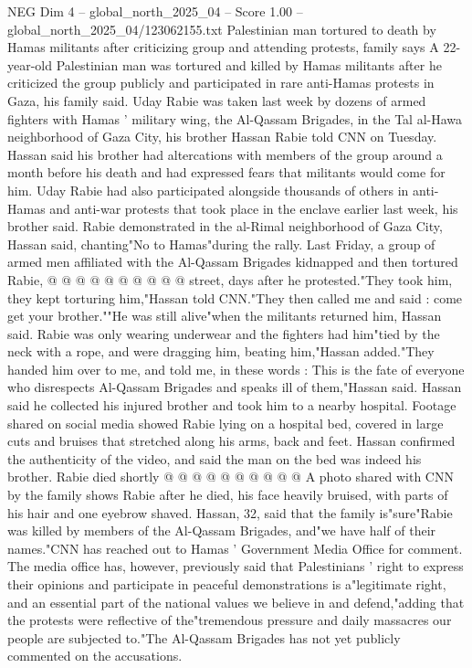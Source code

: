 \begin{textsample}{NEG Dim 4 – global\_north\_2025\_04 – Score 1.00 – global\_north\_2025\_04/123062155.txt}  \label{ex:f4_neg_243}
Palestinian man tortured to death by Hamas militants after criticizing group and attending protests, family says A 22-year-old Palestinian man was tortured and killed by Hamas militants after he criticized the group publicly and participated in rare anti-Hamas protests in Gaza, his family said.
Uday Rabie was taken last week by dozens of armed fighters with Hamas ' military wing, the Al-Qassam Brigades, in the Tal al-Hawa neighborhood of Gaza City, his brother Hassan Rabie told CNN on Tuesday.
Hassan said his brother had altercations with members of the group around a month before his death and had expressed fears that militants would come for him.
Uday Rabie had also participated alongside thousands of others in anti-Hamas and anti-war protests that took place in the enclave earlier last week, his brother said.
Rabie demonstrated in the al-Rimal neighborhood of Gaza City, Hassan said, chanting"No to Hamas"during the rally.
Last Friday, a group of armed men affiliated with the Al-Qassam Brigades kidnapped and then tortured Rabie, @ @ @ @ @ @ @ @ @ @ street, days after he protested."They took him, they kept torturing him,"Hassan told CNN."They then called me and said : come get your brother.""He was still alive"when the militants returned him, Hassan said.
Rabie was only wearing underwear and the fighters had him"tied by the neck with a rope, and were dragging him, beating him,"Hassan added."They handed him over to me, and told me, in these words : This is the fate of everyone who disrespects Al-Qassam Brigades and speaks ill of them,"Hassan said.
Hassan said he collected his injured brother and took him to a nearby hospital.
Footage shared on social media showed Rabie lying on a hospital bed, covered in large cuts and bruises that stretched along his arms, back and feet.
Hassan confirmed the authenticity of the video, and said the man on the bed was indeed his brother.
Rabie died shortly @ @ @ @ @ @ @ @ @ @ A photo shared with CNN by the family shows Rabie after he died, his face heavily bruised, with parts of his hair and one eyebrow shaved.
Hassan, 32, said that the family is"sure"Rabie was killed by members of the Al-Qassam Brigades, and"we have half of their names."CNN has reached out to Hamas ' Government Media Office for comment.
The media office has, however, previously said that Palestinians ' right to express their opinions and participate in peaceful demonstrations is a"legitimate right, and an essential part of the national values we believe in and defend,"adding that the protests were reflective of the"tremendous pressure and daily massacres our people are subjected to."The Al-Qassam Brigades has not yet publicly commented on the accusations.

\end{textsample}
